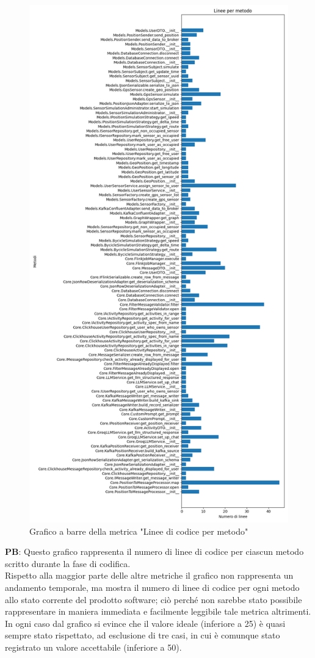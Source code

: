 \documentclass[10pt]{article}
\begin{document}
\begin{justify}
\begin{figure}[H]
  \centering
  \includegraphics[width=0.7\linewidth]{metrics_lines.png}
  \caption{Grafico a barre della metrica "Linee di codice per metodo"}
\end{figure}

\textbf{PB}: Questo grafico rappresenta il numero di linee di codice per ciascun metodo scritto durante la fase di codifica.\\
Rispetto alla maggior parte delle altre metriche il grafico non rappresenta un andamento temporale, ma mostra il numero di linee di codice per ogni metodo allo stato
corrente del prodotto software; ciò perché non sarebbe stato possibile rappresentare in maniera immediata e  facilmente leggibile tale metrica altrimenti.\\
In ogni caso dal grafico si evince che il valore ideale (inferiore a 25) è quasi sempre stato rispettato, ad esclusione di tre casi, in cui è comunque stato registrato
un valore accettabile (inferiore a 50).\\



\end{justify}
\end{document}
